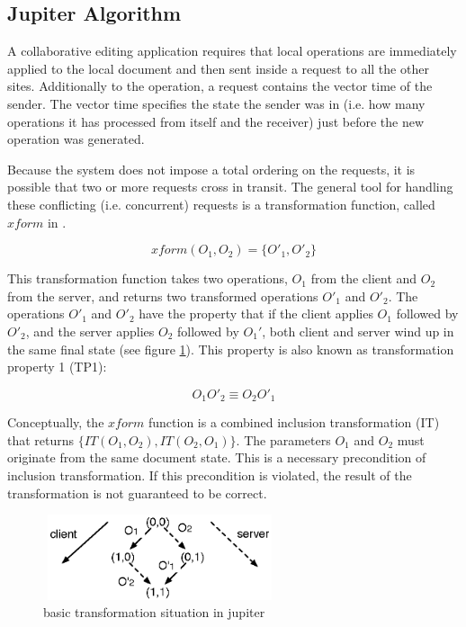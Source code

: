 \subsection{Jupiter Algorithm}
A collaborative editing application requires that local operations are immediately applied to the local document and then sent inside a request to all
the other sites. Additionally to the operation, a request contains the vector
time of the sender. The vector time specifies the state the sender was in
(i.e. how many operations it has processed from itself and the receiver) just
before the new operation was generated.

Because the system does not impose a total ordering on the requests, it is
possible that two or more requests cross in transit. The general tool for 
handling these conflicting (i.e. concurrent) requests is a transformation function, called $xform$ in \cite{jupiter95}.

$$ xform(O_1,O_2)=\{O'_1,O'_2\} $$

This transformation function takes two operations, $O_1$ from the client and 
$O_2$ from the server, and returns two transformed operations $O'_1$ and $O'_2$.
The operations $O'_1$ and $O'_2$ have the property that if the client applies 
$O_1$ followed by $O'_2$, and the server applies $O_2$ followed by $O_1'$, both 
client and server wind up in the same final state (see figure 
\ref{fig:concepts.basic}). This property is also known as transformation property 1 (TP1):

$$ O_1 O'_2 \equiv O_2 O'_1 $$

Conceptually, the $xform$ function is a combined inclusion transformation (IT) 
that returns $\{IT(O_1,O_2),IT(O_2,O_1)\}$. The parameters $O_1$ and $O_2$ must 
originate from the same document state. This is a necessary precondition of 
inclusion transformation. If this precondition is violated, the result of the 
transformation is not guaranteed to be correct.

\begin{figure}[htb]
 \centering
 \includegraphics[width=6.85cm,height=2.5cm]{../images/finalreport/concepts_jupiter1.eps}
 \caption{basic transformation situation in jupiter}
 \label{fig:concepts.basic}
\end{figure}

